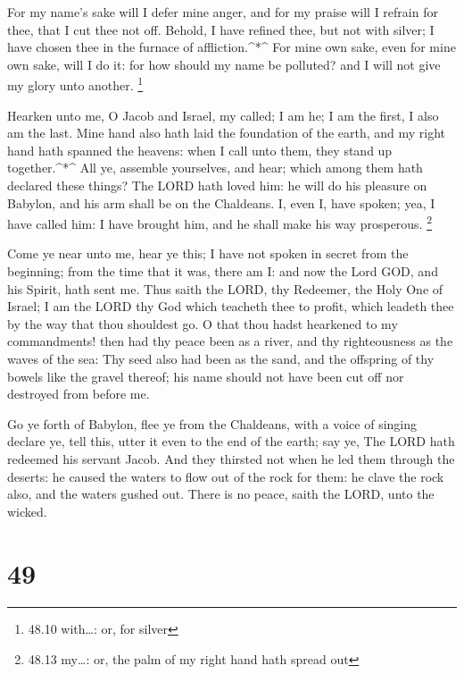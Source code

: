  For my name's sake will I defer mine anger, and for my
praise will I refrain for thee, that I cut thee not off. 
Behold, I have refined thee, but not with silver; I have chosen thee in
the furnace of affliction.\^{}*\^{}  For mine own sake,
even for mine own sake, will I do it: for how should my name be
polluted? and I will not give my glory unto another. \footnote{48.10
  with\ldots: or, for silver}

 Hearken unto me, O Jacob and Israel, my called; I am he; I
am the first, I also am the last.  Mine hand also hath laid
the foundation of the earth, and my right hand hath spanned the heavens:
when I call unto them, they stand up together.\^{}*\^{} 
All ye, assemble yourselves, and hear; which among them hath declared
these things? The LORD hath loved him: he will do his pleasure on
Babylon, and his arm shall be on the Chaldeans.  I, even I,
have spoken; yea, I have called him: I have brought him, and he shall
make his way prosperous. \footnote{48.13 my\ldots: or, the palm of my
  right hand hath spread out}

 Come ye near unto me, hear ye this; I have not spoken in
secret from the beginning; from the time that it was, there am I: and
now the Lord GOD, and his Spirit, hath sent me.  Thus saith
the LORD, thy Redeemer, the Holy One of Israel; I am the LORD thy God
which teacheth thee to profit, which leadeth thee by the way that thou
shouldest go.  O that thou hadst hearkened to my
commandments! then had thy peace been as a river, and thy righteousness
as the waves of the sea:  Thy seed also had been as the
sand, and the offspring of thy bowels like the gravel thereof; his name
should not have been cut off nor destroyed from before me.

 Go ye forth of Babylon, flee ye from the Chaldeans, with a
voice of singing declare ye, tell this, utter it even to the end of the
earth; say ye, The LORD hath redeemed his servant Jacob. 
And they thirsted not when he led them through the deserts: he caused
the waters to flow out of the rock for them: he clave the rock also, and
the waters gushed out.  There is no peace, saith the LORD,
unto the wicked.

\hypertarget{section-48}{%
\section{49}\label{section-48}}

